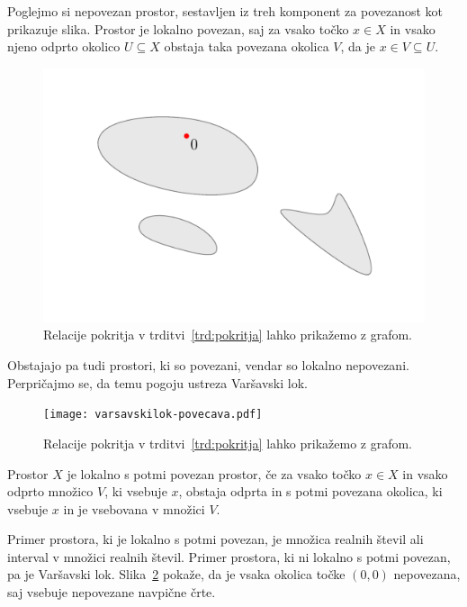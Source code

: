 \documentclass[../TG_magistrsko_delo_sections.tex]{subfiles}
\begin{document}
\begin{primer}
Poglejmo si nepovezan prostor, sestavljen iz treh komponent za povezanost kot prikazuje slika. Prostor je lokalno povezan, saj za vsako točko $x \in X$ in vsako njeno odprto okolico $U\subseteq X$ obstaja taka povezana okolica $V$, da je $x \in V \subseteq U$.
\begin{figure}[h]
  \centering
  \includegraphics{nepov-lokpov.pdf}
  \caption[Primer vektorske slike.]{Relacije pokritja v trditvi~\ref{trd:pokritja} lahko prikažemo z grafom.}
  \label{fig:varsavski_lok}
\end{figure}
\end{primer}

Obstajajo pa tudi prostori, ki so povezani, vendar so lokalno nepovezani. Perpričajmo se, da temu pogoju ustreza Varšavski lok. 

\begin{figure}[h]
  \centering
  \texttt{[image: varsavskilok-povecava.pdf]}
  \caption[Primer vektorske slike.]{Relacije pokritja v trditvi~\ref{trd:pokritja} lahko prikažemo z grafom.}
  \label{fig:vl-lok-nepovezan}
\end{figure}

\begin{definicija}
Prostor $X$ je lokalno s potmi povezan prostor, če za vsako točko $ x\in X$ in vsako odprto množico $V$, ki vsebuje $x$, obstaja odprta in s potmi povezana okolica, ki vsebuje $x$ in je vsebovana v množici $V$.
\end{definicija}

Primer prostora, ki je lokalno s potmi povezan, je množica realnih števil ali interval v množici realnih števil. Primer prostora, ki ni lokalno s potmi povezan, pa je Varšavski lok. Slika~\ref{fig:vl-lok-nepovezan} pokaže, da je vsaka okolica točke $(0, 0)$ nepovezana, saj vsebuje nepovezane navpične črte.
\end{document}
